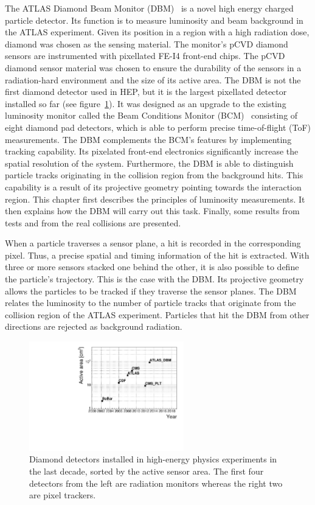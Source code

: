 The ATLAS Diamond Beam Monitor (DBM)~\cite{} is a novel high energy charged particle detector. Its function is to measure luminosity and beam background in the ATLAS experiment. Given its position in a region with a high radiation dose, diamond was chosen as the sensing material. The monitor's pCVD diamond sensors are instrumented with pixellated FE-I4 front-end chips. The pCVD diamond sensor material was chosen to ensure the durability of the sensors in a radiation-hard environment and the size of its active area. The DBM is not the first diamond detector used in HEP, but it is the largest pixellated detector installed so far (see figure~\ref{fig:areavsyear}). It was designed as an upgrade to the existing luminosity monitor called the Beam Conditions Monitor (BCM)~\cite{} consisting of eight diamond pad detectors, which is able to perform precise time-of-flight (ToF) measurements. The DBM complements the BCM's features by implementing tracking capability. Its pixelated front-end electronics significantly increase the spatial resolution of the system. Furthermore, the DBM is able to distinguish particle tracks originating in the collision region from the background hits. This capability is a result of its projective geometry pointing towards the interaction region. This chapter first describes the principles of luminosity measurements. It then explains how the DBM will carry out this task. Finally, some results from tests and from the real collisions are presented. 

When a particle traverses a sensor plane, a hit is recorded in the corresponding pixel. Thus, a precise spatial and timing information of the hit is extracted. With three or more sensors stacked one behind the other, it is also possible to define the particle's trajectory. This is the case with the DBM. Its projective geometry allows the particles to be tracked if they traverse the sensor planes. The DBM relates the luminosity to the number of particle tracks that originate from the collision region of the ATLAS experiment. Particles that hit the DBM from other directions are rejected as background radiation.

\begin{figure}[!t]
\centering
\includegraphics[width=0.6\textwidth]{../scripts/04_charge_monitoring/plots/detArea}
\caption{Diamond detectors installed in high-energy physics experiments in the last decade, sorted by the active sensor area. The first four detectors from the left are radiation monitors whereas the right two are pixel trackers.}
\label{fig:areavsyear}
\end{figure}


